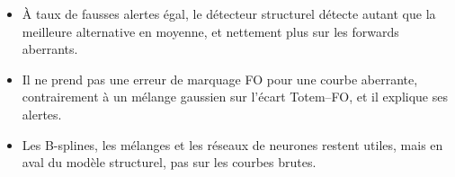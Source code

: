 \begin{retenir}
\begin{itemize}[leftmargin=12pt]
\item À taux de fausses alertes égal, le détecteur structurel détecte autant que la meilleure alternative en moyenne,
et nettement plus sur les forwards aberrants.
\item Il ne prend pas une erreur de marquage FO pour une courbe aberrante, contrairement à un mélange gaussien sur
l'écart Totem--FO, et il explique ses alertes.
\item Les B-splines, les mélanges et les réseaux de neurones restent utiles, mais en aval du modèle structurel, pas sur
les courbes brutes.
\end{itemize}
\end{retenir}
